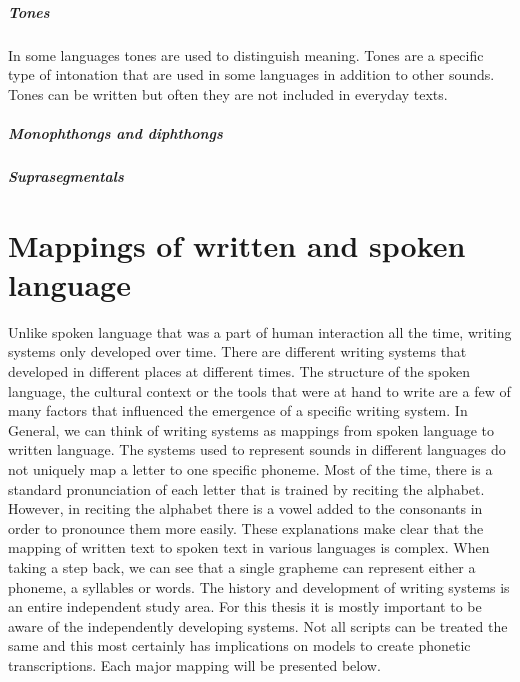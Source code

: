 \subparagraph{Tones} In some languages tones are used to distinguish meaning. Tones are a specific type of intonation that are used in some languages in addition to other sounds. Tones can be written but often they are not included in everyday texts. 

\subparagraph{Monophthongs and diphthongs}


\subparagraph{Suprasegmentals}



\section{Mappings of written and spoken language}
\label{writing-sys}
Unlike spoken language that was a part of human interaction all the time, writing systems only developed over time. There are different writing systems that developed in different places at different times. The structure of the spoken language, the cultural context or the tools that were at hand to write are a few of many factors that influenced the emergence of a specific writing system. In General, we can think of writing systems as mappings from spoken language to written language. The systems used to represent sounds in different languages do not uniquely map a letter to one specific phoneme. Most of the time, there is a standard pronunciation of each letter that is trained by reciting the alphabet. However, in reciting the alphabet there is a vowel added to the consonants in order to pronounce them more easily. These explanations make clear that the mapping of written text to spoken text in various languages is complex. When taking a step back, we can see that a single grapheme can represent either a phoneme, a syllables or words. The history and development of writing systems is an entire independent study area. For this thesis it is mostly important to be aware of the independently developing systems. Not all scripts can be treated the same and this most certainly has implications on models to create phonetic transcriptions. Each major mapping will be presented below.

